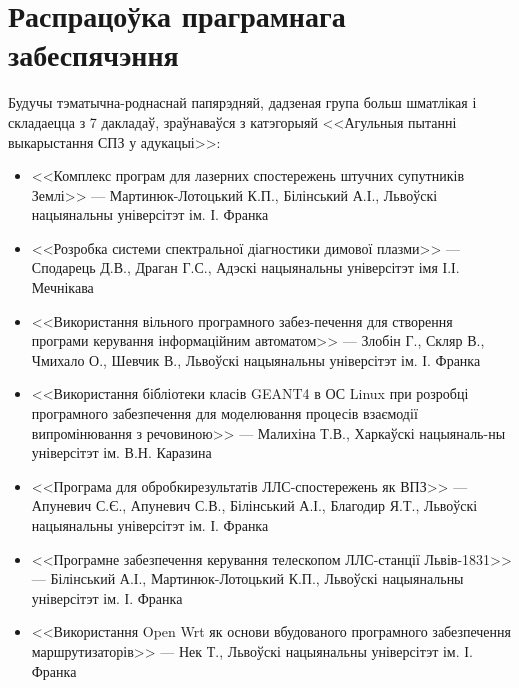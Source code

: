 \documentclass[10pt, a5paper]{article}
\begin{document}
\section{Распрацоўка праграмнага забеспячэння}
Будучы тэматычна-роднаснай папярэдняй, дадзеная група больш шматлікая і складаецца з 7 дакладаў, зраўнаваўся з катэгорыяй <<Агульныя пытанні выкарыстання СПЗ у адукацыі>>:
\begin{itemize}
\item <<Комплекс програм для лазерних спостережень штучних супутників Землі>> --- Мартинюк-Лотоцький К.П., Білінський А.І., Львоўскі нацыянальны  універсітэт ім. І. Франка
\item <<Розробка системи спектральної діагностики димової плазми>> --- Сподарець Д.В., Драган Г.С., Адэскі нацыянальны універсітэт імя І.І. Мечнікава
\item <<Використання вільного програмного забез-печення для створення програми керування інформаційним автоматом>> --- Злобін Г., Скляр В., Чмихало О., Шевчик В., Львоўскі нацыянальны  універсітэт ім. І. Франка
\item <<Використання бібліотеки класів GEANT4 в ОС Linux при розробці програмного забезпечення для моделювання процесів взаємодії випромінювання з речовиною>> --- Малихіна Т.В., Харкаўскі нацыяналь-ны універсітэт ім. В.Н. Каразина
\item  <<Програма для обробкирезультатів ЛЛС-спостережень як ВПЗ>> --- Апуневич С.Є., Апуневич С.В., Білінський А.І., Благодир Я.Т., Львоўскі нацыянальны  універсітэт ім. І. Франка
\item  <<Програмне забезпечення керування телескопом  ЛЛС-станції Львів-1831>> --- Білінський А.І., Мартинюк-Лотоцький К.П., Львоўскі нацыянальны  універсітэт ім. І. Франка
\item <<Використання Open Wrt як основи вбудованого програмного забезпечення маршрутизаторів>> --- Нек Т., Львоўскі нацыянальны  універсітэт ім. І. Франка
\end{itemize}
\end{document}
